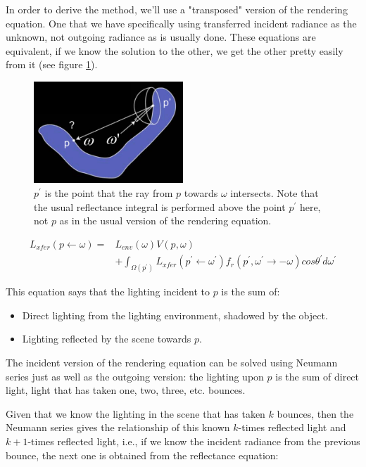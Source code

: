 In order to derive the method, we'll use a "transposed" version of the rendering equation. One that we have specifically using transferred incident radiance as the unknown, not outgoing radiance as is usually done. These equations are equivalent, if we know the solution to the other, we get the other pretty easily from it (see figure \ref{f:pl-transposed-version}).

\begin{figure}
\sidecaption
	\includegraphics[width=0.5\textwidth]{figures/prt/prt-12}
	\caption{$p^{'}$ is the point that the ray from $p$ towards $\omega$ intersects. Note that the usual reflectance integral is performed above the point $p^{'}$ here, not $p$ as in the usual version of the rendering equation.}
	\label{f:pl-transposed-version}
\end{figure}

\begin{equation*}
\begin{aligned}
	L_{xfer}(p\leftarrow\omega)=&L_{env}(\omega)V(p,\omega)\\
	&+\int_{\Omega (p^{'})}L_{xfer}(p^{'}\leftarrow\omega^{'})f_r(p^{'},\omega^{'}\to -\omega)cos\theta^{'}d\omega^{'}
\end{aligned}
\end{equation*}

This equation says that the lighting incident to $p$ is the sum of:

\begin{itemize}
	\item Direct lighting from the lighting environment, shadowed by the object.
	\item Lighting reflected by the scene towards $p$.
\end{itemize}

The incident version of the rendering equation can be solved using Neumann series just as well as the outgoing version: the lighting upon $p$ is the sum of direct light, light that has taken one, two, three, etc. bounces.

Given that we know the lighting in the scene that has taken $k$ bounces, then the Neumann series gives the relationship of this known $k$-times reflected light and $k+1$-times reflected light, i.e., if we know the incident radiance from the previous bounce, the next one is obtained from the reflectance equation:

